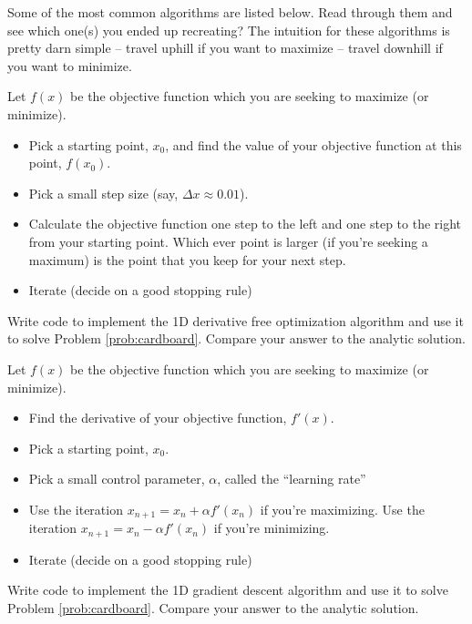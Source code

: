 Some of the most common algorithms are listed below.  Read through them and see which
one(s) you ended up recreating?  The intuition for these algorithms is pretty darn simple
-- travel uphill if you want to maximize -- travel downhill if you want to minimize.

\begin{algorithm}
    Let $f(x)$ be the objective function which you are seeking to maximize (or minimize).
    \begin{itemize}
        \item Pick a starting point, $x_0$, and find the value of your
            objective function at this point, $f(x_0)$.
        \item Pick a small step size (say, $\Delta x \approx 0.01$).
        \item Calculate the objective function one step to the left and
            one step to the right from your starting point.  Which ever
            point is larger (if you're seeking a maximum) is the point
            that you keep for your next step.
        \item Iterate (decide on a good stopping rule)
    \end{itemize}
\end{algorithm}
\begin{problem}
    Write code to implement the 1D derivative free optimization algorithm and use it to solve
    Problem \ref{prob:cardboard}.  Compare your answer to the analytic solution.
\end{problem}

\begin{algorithm}
    Let $f(x)$ be the objective function which you are seeking to maximize (or minimize).
    \begin{itemize}
        \item Find the derivative of your objective function, $f'(x)$.
        \item Pick a starting point, $x_0$.
        \item Pick a small control parameter, $\alpha$, called the ``learning rate''
        \item Use the iteration $x_{n+1} = x_n + \alpha f'(x_n) $ if you're maximizing.
            Use the iteration $x_{n+1} = x_n - \alpha f'(x_n)$ if you're minimizing.
        \item Iterate (decide on a good stopping rule)
    \end{itemize}
\end{algorithm}
\begin{problem}
    Write code to implement the 1D gradient descent algorithm and use it to solve
    Problem \ref{prob:cardboard}. Compare your answer to the analytic solution.
\end{problem}

